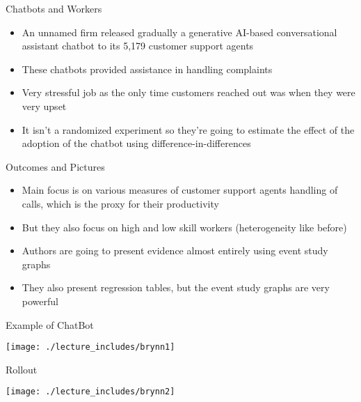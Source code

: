 \documentclass{beamer}
\begin{document}
\begin{frame}{Chatbots and Workers}

\begin{itemize}

\item An unnamed firm released gradually a generative AI-based conversational assistant chatbot to its  5,179 customer support agents 
\item These chatbots provided assistance in handling complaints
\item Very stressful job as the only time customers reached out was when they were very upset
\item It isn't a randomized experiment so they're going to estimate the effect of the adoption of the chatbot using difference-in-differences

\end{itemize}

\end{frame}

\begin{frame}{Outcomes and Pictures}

\begin{itemize}

\item Main focus is on various measures of customer support agents handling of calls, which is the proxy for their productivity
\item But they also focus on high and low skill workers (heterogeneity like before)
\item Authors are going to present evidence almost entirely using event study graphs
\item They also present regression tables, but the event study graphs are very powerful

\end{itemize}

\end{frame}




\begin{frame}{Example of ChatBot}
\begin{center}
\texttt{[image: ./lecture\_includes/brynn1]}
\end{center}
\end{frame}


\begin{frame}{Rollout}
\begin{center}
\texttt{[image: ./lecture\_includes/brynn2]}
\end{center}
\end{frame}
\end{document}

